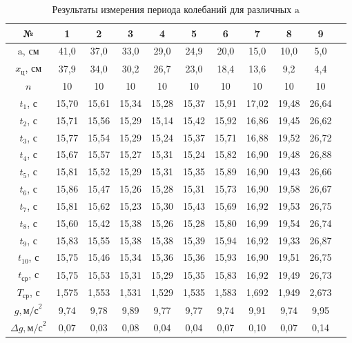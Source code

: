 \documentclass[a4paper,12pt]{article}
\begin{document}
 	\begin{table}[H]
 		\begin{center}
 			\begin{tabular}{|c|c|c|c|c|c|c|c|c|c|c|}
 				\hline
 				№ & 1 & 2 & 3 & 4 & 5 & 6 & 7 & 8 & 9\\
 				\hline
 				$\text{a}$, см & 41,0 & 37,0 & 33,0 & 29,0 & 24,9 & 20,0 & 15,0 & 10,0 & 5,0\\
 				\hline
 				$x_\text{ц}$, см & 37,9 & 34,0 & 30,2 & 26,7 & 23,0 & 18,4 & 13,6 & 9,2 & 4,4\\
 				\hline
 				$n$ & 10 & 10 & 10 & 10 & 10 & 10 & 10 & 10 & 10\\
 				\hline
 				$t_1$, с & 15,70 & 15,61 & 15,34 & 15,28 & 15,37 & 15,91 & 17,02 & 19,48 & 26,64\\
 				\hline
 				$t_2$, с & 15,71 & 15,56 & 15,29 & 15,14 & 15,42 & 15,92 & 16,86 & 19,45 & 26,62\\
 				\hline
 				$t_3$, с & 15,77 & 15,54 & 15,29 & 15,24 & 15,37 & 15,71 & 16,88 & 19,52 & 26,72\\
 				\hline
 				$t_4$, с & 15,67 & 15,57 & 15,27 & 15,31 & 15,24 & 15,82 & 16,90 & 19,48 & 26,88\\
 				\hline
 				$t_5$, с & 15,81 & 15,52 & 15,29 & 15,31 & 15,35 & 15,89 & 16,90 & 19,43 & 26,66\\
 				\hline
 				$t_6$, с & 15,86 & 15,47 & 15,26 & 15,28 & 15,31 & 15,73 & 16,90 & 19,58 & 26,67\\
 				\hline
 				$t_7$, с & 15,81 & 15,62 & 15,23 & 15,30 & 15,43 & 15,69 & 16,92 & 19,53 & 26,75\\
 				\hline
 				$t_8$, с & 15,60 & 15,42 & 15,38 & 15,26 & 15,28 & 15,80 & 16,99 & 19,54 & 26,74\\
 				\hline
 				$t_9$, с & 15,83 & 15,55 & 15,38 & 15,38 & 15,39 & 15,94 & 16,92 & 19,33 & 26,87\\
 				\hline
 				$t_10$, с & 15,75 & 15,46 & 15,34 & 15,36 & 15,36 & 15,93 & 16,90 & 19,51 & 26,75\\
 				\hline
 				$t_\text{ср}$, с & 15,75 & 15,53 & 15,31 & 15,29 & 15,35 & 15,83 & 16,92 & 19,49 & 26,73\\
 				\hline
 				$T_\text{ср}$, с & 1,575 & 1,553 & 1,531 & 1,529 & 1,535 & 1,583 & 1,692 & 1,949 & 2,673\\
 				\hline
 				$g, \text{м/с}^2$ & 9,74 & 9,78 & 9,89 & 9,77 & 9,77 & 9,74 & 9,91 & 9,74 & 9,95\\
 				\hline
 				$\Delta g, \text{м/с}^2$ & 0,07 & 0,03 & 0,08 & 0,04 & 0,04 & 0,07 & 0,10 & 0,07 & 0,14\\
 				\hline
 			\end{tabular}
 		\end{center}
 		\caption{Результаты измерения периода колебаний для различных $\text{a}$}
 		\label{tab2}
 	\end{table}        
 	
\end{document}

